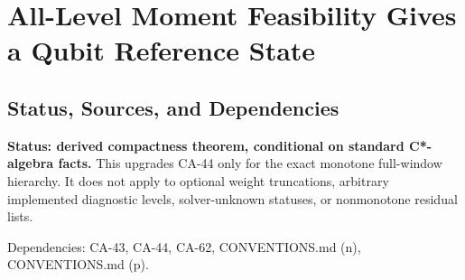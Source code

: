 
\section{All-Level Moment Feasibility Gives a Qubit Reference State}
\label{sec:qubit-moment-state-existence}

\subsection{Status, Sources, and Dependencies}

\textbf{Status: derived compactness theorem, conditional on standard
C*-algebra facts.}  This upgrades CA-44 only for the exact monotone
full-window hierarchy.  It does not apply to optional weight truncations,
arbitrary implemented diagnostic levels, solver-unknown statuses, or
nonmonotone residual lists.

Dependencies: CA-43, CA-44, CA-62, CONVENTIONS.md (n), CONVENTIONS.md (p).


